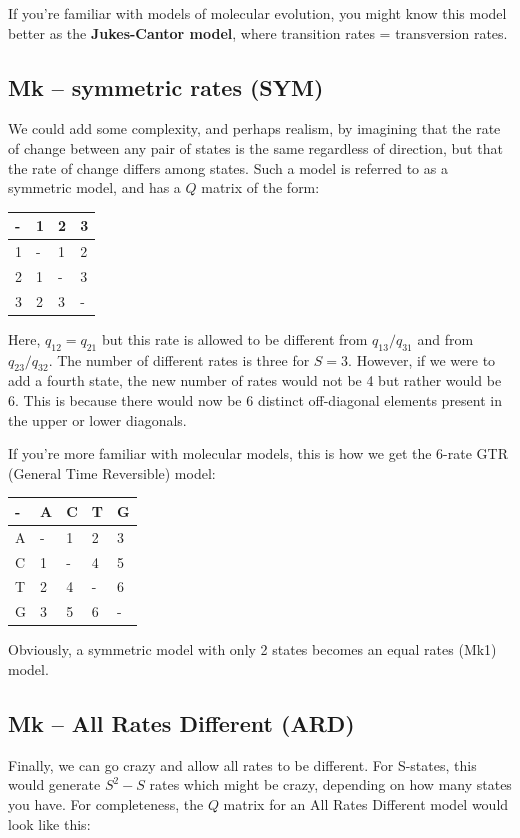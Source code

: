 \documentclass[]{book}
\begin{document}
If you're familiar with models of molecular evolution, you might know
this model better as the \textbf{Jukes-Cantor model}, where transition
rates = transversion rates.

\subsection{Mk -- symmetric rates (SYM)}\label{mk-symmetric-rates-sym}

We could add some complexity, and perhaps realism, by imagining that the
rate of change between any pair of states is the same regardless of
direction, but that the rate of change differs among states. Such a
model is referred to as a symmetric model, and has a \(Q\) matrix of the
form:

\begin{longtable}[]{@{}llll@{}}
\toprule
- & 1 & 2 & 3\tabularnewline
\midrule
\endhead
1 & - & 1 & 2\tabularnewline
2 & 1 & - & 3\tabularnewline
3 & 2 & 3 & -\tabularnewline
\bottomrule
\end{longtable}

Here, \(q_{12} = q_{21}\) but this rate is allowed to be different from
\(q_{13}/q_{31}\) and from \(q_{23}/q_{32}\). The number of different
rates is three for \(S = 3\). However, if we were to add a fourth state,
the new number of rates would not be 4 but rather would be 6. This is
because there would now be 6 distinct off-diagonal elements present in
the upper or lower diagonals.

If you're more familiar with molecular models, this is how we get the
6-rate GTR (General Time Reversible) model:

\begin{longtable}[]{@{}lllll@{}}
\toprule
- & A & C & T & G\tabularnewline
\midrule
\endhead
A & - & 1 & 2 & 3\tabularnewline
C & 1 & - & 4 & 5\tabularnewline
T & 2 & 4 & - & 6\tabularnewline
G & 3 & 5 & 6 & -\tabularnewline
\bottomrule
\end{longtable}

Obviously, a symmetric model with only 2 states becomes an equal rates
(Mk1) model.

\subsection{Mk -- All Rates Different
(ARD)}\label{mk-all-rates-different-ard}

Finally, we can go crazy and allow all rates to be different. For
S-states, this would generate \(S^2 - S\) rates which might be crazy,
depending on how many states you have. For completeness, the \(Q\)
matrix for an All Rates Different model would look like this:
\end{document}
